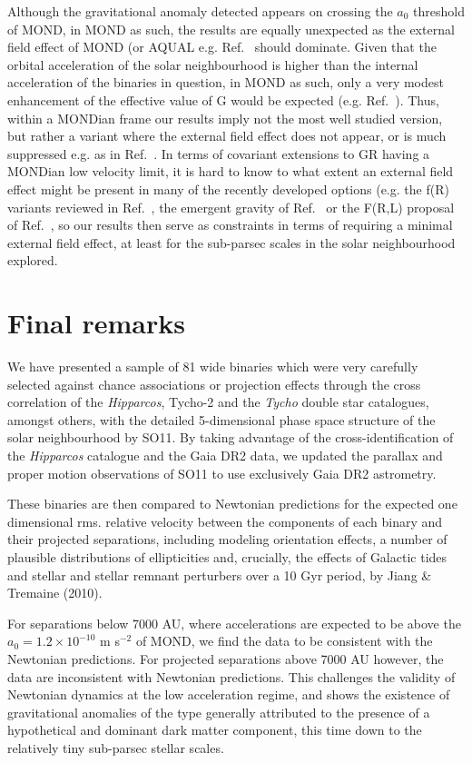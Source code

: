 \documentclass{ws-ijmpd}
\begin{document}
Although the gravitational anomaly detected appears on crossing the $a_{0}$ threshold of MOND, in MOND as such, the results
are equally unexpected as the external field effect of MOND (or AQUAL e.g.  Ref.~ should dominate. Given
that the
orbital acceleration of the solar neighbourhood is higher than the internal acceleration of the binaries in question, in
MOND as such, only a very modest enhancement of the effective value of G would be expected (e.g.  Ref.~).
Thus, within a MONDian frame our results imply not the most well studied version, but rather a variant where the external
field effect does not appear, or is much suppressed e.g. as in  Ref.~. In terms of covariant extensions to GR having a
MONDian low velocity limit, it is hard to know to what extent an external field effect might be present in many of the recently
developed options (e.g. the f(R) variants reviewed in Ref.~, the emergent gravity of Ref.~
or the F(R,L) proposal of Ref.~, so our results then serve as constraints in terms of requiring a
minimal external field effect, at least for the sub-parsec scales in the solar neighbourhood explored.

\section{Final remarks}


We have presented a sample of 81 wide binaries which were very carefully selected against chance associations or projection
effects through the cross correlation of the {\it Hipparcos}, Tycho-2 and the {\it Tycho} double star catalogues, amongst others,
with the detailed 5-dimensional phase space structure of the solar neighbourhood by SO11. By taking advantage
of the cross-identification of the {\it Hipparcos} catalogue and the Gaia DR2 data, we updated the parallax and proper motion
observations of SO11 to use exclusively Gaia DR2 astrometry.

These binaries are then compared to Newtonian predictions for the expected one dimensional rms. relative velocity between the
components of each binary and their projected separations, including modeling orientation effects, a number of plausible
distributions of ellipticities and, crucially, the effects of Galactic tides and stellar and stellar remnant perturbers over a
10 Gyr period, by Jiang \& Tremaine (2010).

For separations below 7000 AU, where accelerations are expected to be above the $a_{0}=1.2\times 10^{-10}$ { m s$^{-2}$} of MOND,
we find the data to be consistent with the Newtonian predictions. For projected separations above 7000 AU however, the
data are inconsistent with Newtonian predictions. This challenges the validity of Newtonian dynamics at
the low acceleration regime, and shows the existence of gravitational anomalies of the type generally attributed to the
presence of a hypothetical and dominant dark matter component, this time down to the relatively tiny sub-parsec stellar scales.
\end{document}
